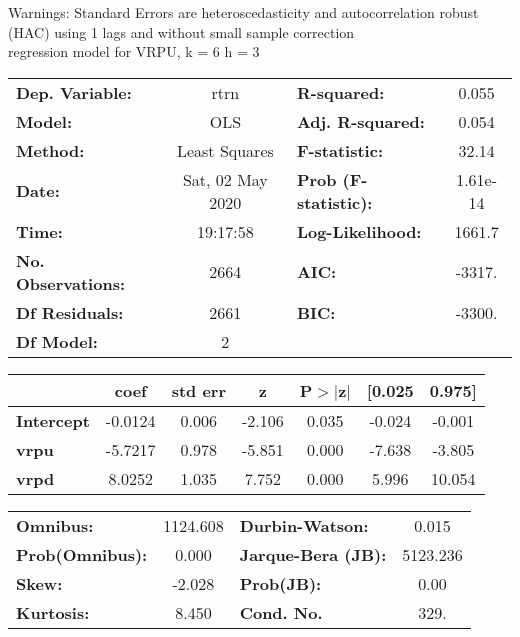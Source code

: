 Warnings: \newline
 [1] Standard Errors are heteroscedasticity and autocorrelation robust (HAC) using 1 lags and without small sample correction\\ 

regression model for VRPU, k = 6 h = 3\begin{center}
\begin{tabular}{lclc}
\toprule
\textbf{Dep. Variable:}    &       rtrn       & \textbf{  R-squared:         } &     0.055   \\
\textbf{Model:}            &       OLS        & \textbf{  Adj. R-squared:    } &     0.054   \\
\textbf{Method:}           &  Least Squares   & \textbf{  F-statistic:       } &     32.14   \\
\textbf{Date:}             & Sat, 02 May 2020 & \textbf{  Prob (F-statistic):} &  1.61e-14   \\
\textbf{Time:}             &     19:17:58     & \textbf{  Log-Likelihood:    } &    1661.7   \\
\textbf{No. Observations:} &        2664      & \textbf{  AIC:               } &    -3317.   \\
\textbf{Df Residuals:}     &        2661      & \textbf{  BIC:               } &    -3300.   \\
\textbf{Df Model:}         &           2      & \textbf{                     } &             \\
\bottomrule
\end{tabular}
\begin{tabular}{lcccccc}
                   & \textbf{coef} & \textbf{std err} & \textbf{z} & \textbf{P$> |$z$|$} & \textbf{[0.025} & \textbf{0.975]}  \\
\midrule
\textbf{Intercept} &      -0.0124  &        0.006     &    -2.106  &         0.035        &       -0.024    &       -0.001     \\
\textbf{vrpu}      &      -5.7217  &        0.978     &    -5.851  &         0.000        &       -7.638    &       -3.805     \\
\textbf{vrpd}      &       8.0252  &        1.035     &     7.752  &         0.000        &        5.996    &       10.054     \\
\bottomrule
\end{tabular}
\begin{tabular}{lclc}
\textbf{Omnibus:}       & 1124.608 & \textbf{  Durbin-Watson:     } &    0.015  \\
\textbf{Prob(Omnibus):} &   0.000  & \textbf{  Jarque-Bera (JB):  } & 5123.236  \\
\textbf{Skew:}          &  -2.028  & \textbf{  Prob(JB):          } &     0.00  \\
\textbf{Kurtosis:}      &   8.450  & \textbf{  Cond. No.          } &     329.  \\
\bottomrule
\end{tabular}
\end{center}

